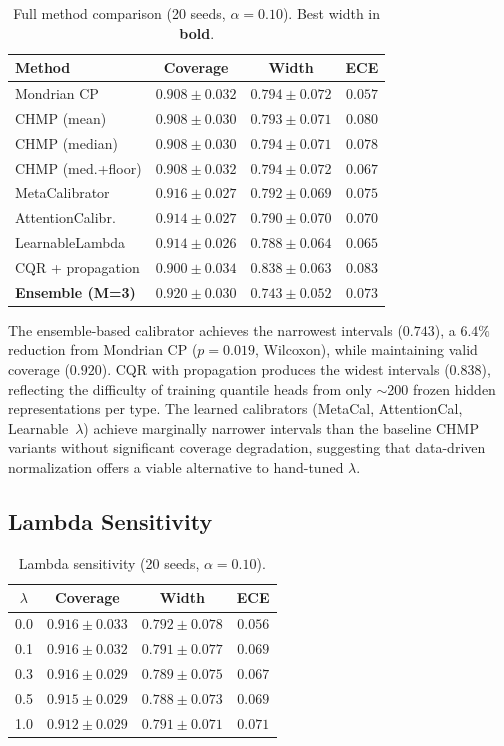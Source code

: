 \documentclass[twoside,11pt]{article}
\begin{document}
\begin{table}[ht]
\centering
\caption{Full method comparison (20 seeds, $\alpha = 0.10$).
Best width in \textbf{bold}.}
\label{tab:full}
\begin{tabular}{lccc}
\toprule
Method & Coverage & Width & ECE \\
\midrule
Mondrian CP & $0.908 \pm 0.032$ & $0.794 \pm 0.072$ & $\mathbf{0.057}$ \\
CHMP (mean) & $0.908 \pm 0.030$ & $0.793 \pm 0.071$ & $0.080$ \\
CHMP (median) & $0.908 \pm 0.030$ & $0.794 \pm 0.071$ & $0.078$ \\
CHMP (med.+floor) & $0.908 \pm 0.032$ & $0.794 \pm 0.072$ & $0.067$ \\
MetaCalibrator & $0.916 \pm 0.027$ & $0.792 \pm 0.069$ & $0.075$ \\
AttentionCalibr. & $0.914 \pm 0.027$ & $0.790 \pm 0.070$ & $0.070$ \\
LearnableLambda & $0.914 \pm 0.026$ & $0.788 \pm 0.064$ & $0.065$ \\
CQR + propagation & $0.900 \pm 0.034$ & $0.838 \pm 0.063$ & $0.083$ \\
\textbf{Ensemble (M=3)} & $0.920 \pm 0.030$ & $\mathbf{0.743 \pm 0.052}$ & $0.073$ \\
\bottomrule
\end{tabular}
\end{table}

The ensemble-based calibrator achieves the narrowest intervals ($0.743$), a
$6.4\%$ reduction from Mondrian CP ($p = 0.019$, Wilcoxon), while maintaining
valid coverage ($0.920$). CQR with propagation produces the widest intervals
($0.838$), reflecting the difficulty of training quantile heads from only
$\sim$200 frozen hidden representations per type. The learned calibrators
(MetaCal, AttentionCal, Learnable~$\lambda$) achieve marginally narrower
intervals than the baseline CHMP variants without significant coverage
degradation, suggesting that data-driven normalization offers a viable
alternative to hand-tuned $\lambda$.

\subsection{Lambda Sensitivity}

\begin{table}[ht]
\centering
\caption{Lambda sensitivity (20 seeds, $\alpha = 0.10$).}
\label{tab:lambda}
\begin{tabular}{cccc}
\toprule
$\lambda$ & Coverage & Width & ECE \\
\midrule
0.0 & $0.916 \pm 0.033$ & $0.792 \pm 0.078$ & $0.056$ \\
0.1 & $0.916 \pm 0.032$ & $0.791 \pm 0.077$ & $0.069$ \\
0.3 & $0.916 \pm 0.029$ & $0.789 \pm 0.075$ & $0.067$ \\
0.5 & $0.915 \pm 0.029$ & $0.788 \pm 0.073$ & $0.069$ \\
1.0 & $0.912 \pm 0.029$ & $0.791 \pm 0.071$ & $0.071$ \\
\bottomrule
\end{tabular}
\end{table}
\end{document}
